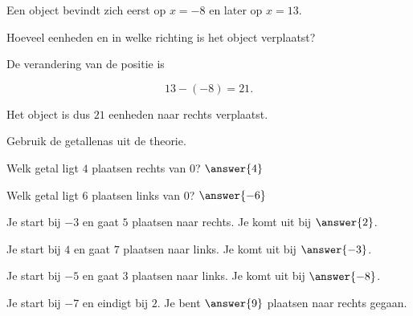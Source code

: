 \documentclass{ximera}
\begin{document}
\begin{oefening}{\oefU}

Een object bevindt zich eerst op \(x=-8\) en later op \(x=13\).

\begin{question}

Hoeveel eenheden en in welke richting is het object verplaatst?

\begin{oplossing}

De verandering van de positie is

\[
13-(-8)=21.
\]

Het object is dus \(21\) eenheden naar rechts verplaatst.

\end{oplossing}

\end{question}

\end{oefening}


\begin{oefening}{\oefB\ESS}

    Gebruik de getallenas uit de theorie.
    
    \begin{question}
    Welk getal ligt \(4\) plaatsen rechts van \(0\)?
    \(\answer{4}\)
    \end{question}
    
    \begin{question}
    Welk getal ligt \(6\) plaatsen links van \(0\)?
    \(\answer{-6}\)
    \end{question}
    
    \begin{question}
    Je start bij \(-3\) en gaat \(5\) plaatsen naar rechts.
    Je komt uit bij \(\answer{2}\).
    \end{question}
    
    \begin{question}
    Je start bij \(4\) en gaat \(7\) plaatsen naar links.
    Je komt uit bij \(\answer{-3}\).
    \end{question}
    
    \begin{question}
    Je start bij \(-5\) en gaat \(3\) plaatsen naar links.
    Je komt uit bij \(\answer{-8}\).
    \end{question}
    
    \begin{question}
    Je start bij \(-7\) en eindigt bij \(2\).
    Je bent \(\answer{9}\) plaatsen naar rechts gegaan.
    \end{question}
    
    \end{oefening}
    
\end{document}
